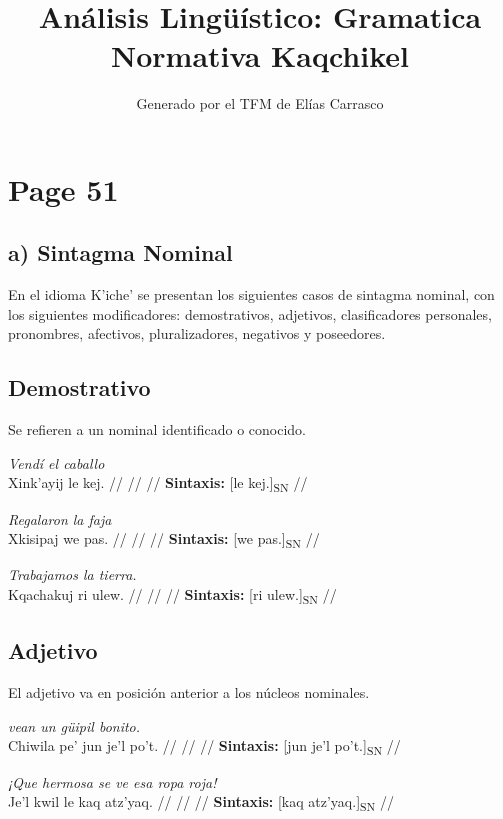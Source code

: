 \documentclass{article}%
\title{Análisis Lingüístico: Gramatica Normativa Kaqchikel}%
\author{Generado por el TFM de Elías Carrasco}%
\begin{document}
%
\normalsize%
\maketitle%
\section{Page 51}%
\label{sec:Page51}%
\subsection{a) Sintagma Nominal}%
\label{subsec:a)SintagmaNominal}%

%
En el idioma K’iche’ se presentan los siguientes casos de sintagma nominal, con los %
siguientes modificadores: demostrativos, adjetivos, clasificadores personales, pronombres, %
afectivos, pluralizadores, negativos y poseedores. %
\subsection{Demostrativo}%
\label{subsec:Demostrativo}%

%
Se refieren a un nominal identificado o conocido. %
\par\medskip%
\ex
\textit{Vendí el caballo} \\
\begingl
\gla Xink’ayij le kej. //
\glb  //
\glc  //
\glft \textbf{Sintaxis:} [le kej.]\textsubscript{SN} //
\endgl
\xe
%
\medskip%
\par\medskip%
\ex
\textit{Regalaron la faja} \\
\begingl
\gla Xkisipaj we pas. //
\glb  //
\glc  //
\glft \textbf{Sintaxis:} [we pas.]\textsubscript{SN} //
\endgl
\xe
%
\medskip%
\par\medskip%
\ex
\textit{Trabajamos la tierra.} \\
\begingl
\gla Kqachakuj ri ulew. //
\glb  //
\glc  //
\glft \textbf{Sintaxis:} [ri ulew.]\textsubscript{SN} //
\endgl
\xe
%
\medskip%
\subsection{Adjetivo}%
\label{subsec:Adjetivo}%

%
El adjetivo va en posición anterior a los núcleos nominales. %
\par\medskip%
\ex
\textit{vean un güipil bonito.} \\
\begingl
\gla Chiwila pe’ jun je’l po’t. //
\glb  //
\glc  //
\glft \textbf{Sintaxis:} [jun je’l po’t.]\textsubscript{SN} //
\endgl
\xe
%
\medskip%
\par\medskip%
\ex
\textit{¡Que hermosa se ve esa ropa roja!} \\
\begingl
\gla Je’l kwil le kaq atz’yaq. //
\glb  //
\glc  //
\glft \textbf{Sintaxis:} [kaq atz’yaq.]\textsubscript{SN} //
\endgl
\xe
%
\medskip%
\end{document}
